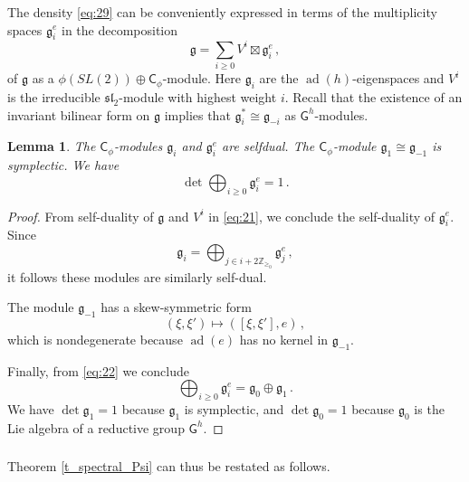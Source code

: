 \documentclass[14pt]{extarticle}
\newcommand{\Z}{\mathbb{Z}}
\newcommand{\bG}{\mathsf{G}}
\newcommand{\bC}{\mathsf{C}}
\newcommand{\fg}{\mathfrak{g}}
\DeclareMathOperator{\ad}{ad}
\newtheorem{Lemma}{Lemma}[section]
\theoremstyle{definition}
\begin{document}
\subsubsection{}
The density \eqref{eq:29} can be conveniently expressed in terms of
the multiplicity spaces $\fg_i^e$ in the decomposition
\begin{equation}
  \fg = \sum_{i\ge 0} V^i \boxtimes \fg^e_i \,,
\label{eq:21}
\end{equation}%
  of $\fg$ as a $\phi(SL(2)) \oplus \bC_\phi$-module. Here
  $\fg_i$ are the $\ad(h)$-eigenspaces and
  $V^i$ is the irreducible $\mathfrak{sl}_2$-module with highest weight
  $i$. Recall that the existence of an invariant bilinear form
  on $\fg$ implies that 
  $\fg_i^* \cong \fg_{-i}$ as $\bG^h$-modules.  


  \begin{Lemma}\label{l_selfdual}
    The $\bC_\phi$-modules $\fg_i$ and $\fg_i^e$ are selfdual.
    The $\bC_\phi$-module $\fg_1\cong \fg_{-1}$ is symplectic.
    We have
    \[
      \det \bigoplus_{i \ge 0} \fg_i^e = 1 \,. 
    \]
\end{Lemma}

\begin{proof}
  From self-duality of $\fg$ and $V^i$ in \eqref{eq:21}, we conclude the
  self-duality of $\fg^e_i$. Since
  \begin{equation}
  \fg_i = \bigoplus_{j \in i +
    2\Z_{\ge_0}} \fg_j^e \,,
\label{eq:22}
\end{equation}
% 
 it follows these modules are similarly self-dual. 
 

  The module $\fg_{-1}$ has a skew-symmetric form
  \[
    (\xi,\xi') \mapsto ([\xi,\xi'],e) \,,
  \]
  which is nondegenerate because $\ad(e)$ has no kernel in
  $\fg_{-1}$.

  Finally, from \eqref{eq:22} we conclude
  \[
    \bigoplus_{i \ge 0} \fg_i^e = \fg_0\oplus \fg_1 \,.
  \]
  We have $\det \fg_1 = 1$ because $\fg_1$ is symplectic, and
  $\det \fg_0 = 1$ because $\fg_0$ is the Lie algebra of a reductive
  group $\bG^h$. 
\end{proof}



\subsubsection{}
Theorem \ref{t_spectral_Psi} can thus be restated as follows. 
\end{document}
